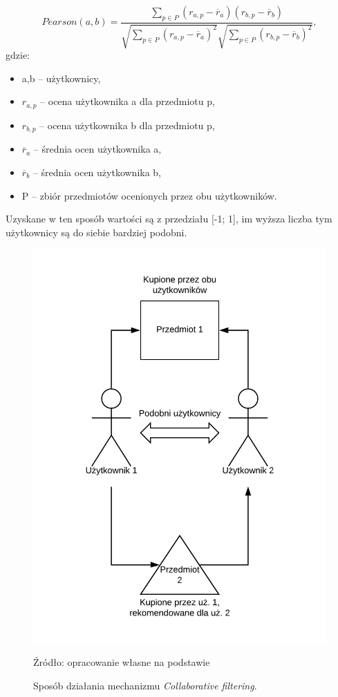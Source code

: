 \begin{equation}
Pearson(a,b) = \frac{\sum\limits_{p \in P}(r_{a,p} - \overline{r}_a)(r_{b,p} - \overline{r}_b)}{\sqrt{\sum\limits_{p \in P}(r_{a,p} - \overline{r}_a)^2}\sqrt{\sum\limits_{p \in P}(r_{b,p} - \overline{r}_b)^2}},
\end{equation} gdzie:
\begin{itemize}
    \item a,b -- użytkownicy,
    \item $r_{a,p}$ -- ocena użytkownika a dla przedmiotu p,
    \item $r_{b,p}$ -- ocena użytkownika b dla przedmiotu p,
    \item $\overline{r}_a$ -- średnia ocen użytkownika a,
    \item $\overline{r}_b$ -- średnia ocen użytkownika b,
    \item P -- zbiór przedmiotów ocenionych przez obu użytkowników.
\end{itemize}

Uzyskane w ten sposób wartości są z przedziału [-1; 1], im wyższa liczba tym użytkownicy są do siebie bardziej podobni.

\begin{figure}
    \centering
    \includegraphics[scale=0.7]{images/collaborative.png}
    \caption{Sposób działania mechanizmu \textit{Collaborative filtering}.}
    Źródło: opracowanie własne na podstawie \cite{challenges_solutions_survey}
    \label{fig:collaborative}
\end{figure}

